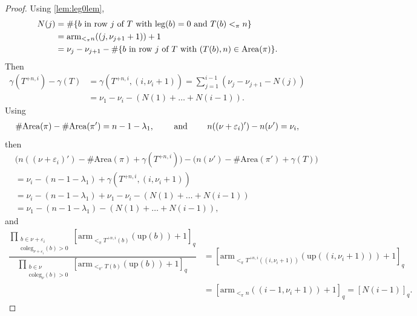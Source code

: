 \documentclass[10pt,a4paper]{amsart}
\newcommand\arm{\mathrm{arm}}
\newcommand\leg{\mathrm{leg}}
\newcommand\up{\mathrm{up}}
\newcommand{\Area}{\mathrm{Area}}
\newcommand{\coleg}{\mathrm{coleg}}
\begin{document}
\begin{proof}

	Using \autoref{lem:leg0lem}, \begin{align}
		N(j) &= \# \{ b \hbox{ in row } j \hbox{ of } T \hbox{ with } \leg(b) = 0 \hbox{ and } T(b) <_\pi n \} 
		\nonumber
		\\
		&= \arm_{<_\pi n}((j,\nu_{j+1}+1))+1 
		\nonumber
		\\
		&= \nu_{j}-\nu_{j+1} - \#\{b \hbox{ in row } j \hbox{ of } T \hbox{ with } (T(b),n) \in \Area(\pi)\}.
		\label{eq:Njprecrel}
	\end{align} 
	Then 
	\begin{align*}
		\gamma(T^{+n,i}) - \gamma(T) 
		&= \gamma(T^{+n,i},(i,\nu_i+1)) 
		= \sum_{j=1}^{i-1}(\nu_j-\nu_{j+1} - N(j)) 
		\\
		&= \nu_1 - \nu_i -  (N(1)+\ldots + N(i-1)).
	\end{align*} 	
	Using 	\begin{align*}
		\# \Area(\pi) - \# \Area(\pi') = n - 1 - \lambda_1,
		\qquad \hbox{ and } \qquad
		n((\nu+\varepsilon_i)')-n(\nu') = \nu_i,
	\end{align*} then
	 \begin{align*}
		&\big(n((\nu+\varepsilon_i)')-\# \Area(\pi)+ \gamma(T^{+n,i}) \big)
		- \big( n(\nu')-\# \Area(\pi') + \gamma(T) \big)
		\\
		&= \nu_i - (n-1-\lambda_1) +  \gamma(T^{+n,i},(i,\nu_i+1))
		\\
		&= \nu_i - (n-1-\lambda_1) + \nu_1 - \nu_i -  (N(1)+\ldots + N(i-1))
		\\
		&= \nu_1 - (n-1-\lambda_1)  - (N(1)+\ldots+N(i-1)),
	\end{align*} 
	and \begin{align*}
		\dfrac{\prod\limits_{\substack{b \in \nu+\varepsilon_i \\ \coleg_{\nu+\varepsilon_i}(b)>0}} [\arm_{<_\pi T^{+n,i}(b)}(\up(b))+1]_q}{\prod\limits_{\substack{b \in \nu \\ \coleg_\nu(b)>0}} [\arm_{<_{\pi'} T(b)}(\up(b))+1]_q} &= [\arm_{<_\pi T^{+n,i}((i,\nu_i+1))}(\up((i,\nu_i+1)))+1]_q
		\\
		&= [\arm_{<_{\pi} n}((i-1,\nu_i+1))+1]_q = [N(i-1)]_q.
	\end{align*}
\end{proof}
\end{document}
